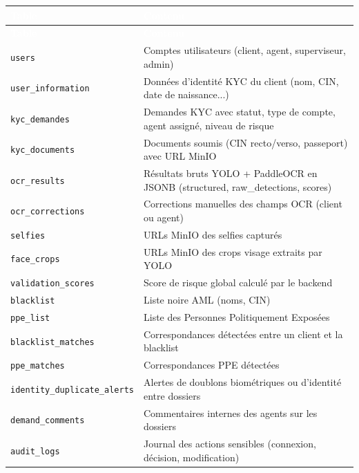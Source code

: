 \renewcommand{\arraystretch}{1.3}
\begin{longtable}{|p{5cm}|p{9.5cm}|}
  \rowcolor{bleu_principal}
  \textcolor{white}{\textbf{Table}} & \textcolor{white}{\textbf{Contenu}} \\
  \hline
  \endfirsthead
  \rowcolor{bleu_principal}
  \textcolor{white}{\textbf{Table}} & \textcolor{white}{\textbf{Contenu}} \\
  \hline
  \endhead
  \texttt{users}                       & Comptes utilisateurs (client, agent, superviseur, admin) \\ \hline
  \texttt{user\_information}           & Données d'identité KYC du client (nom, CIN, date de naissance...) \\ \hline
  \texttt{kyc\_demandes}               & Demandes KYC avec statut, type de compte, agent assigné, niveau de risque \\ \hline
  \texttt{kyc\_documents}              & Documents soumis (CIN recto/verso, passeport) avec URL MinIO \\ \hline
  \texttt{ocr\_results}                & Résultats bruts YOLO + PaddleOCR en JSONB (structured, raw\_detections, scores) \\ \hline
  \texttt{ocr\_corrections}            & Corrections manuelles des champs OCR (client ou agent) \\ \hline
  \texttt{selfies}                     & URLs MinIO des selfies capturés \\ \hline
  \texttt{face\_crops}                 & URLs MinIO des crops visage extraits par YOLO \\ \hline
  \texttt{validation\_scores}          & Score de risque global calculé par le backend \\ \hline
  \texttt{blacklist}                   & Liste noire AML (noms, CIN) \\ \hline
  \texttt{ppe\_list}                   & Liste des Personnes Politiquement Exposées \\ \hline
  \texttt{blacklist\_matches}          & Correspondances détectées entre un client et la blacklist \\ \hline
  \texttt{ppe\_matches}                & Correspondances PPE détectées \\ \hline
  \texttt{identity\_duplicate\_alerts} & Alertes de doublons biométriques ou d'identité entre dossiers \\ \hline
  \texttt{demand\_comments}            & Commentaires internes des agents sur les dossiers \\ \hline
  \texttt{audit\_logs}                 & Journal des actions sensibles (connexion, décision, modification) \\ \hline

\end{longtable}
